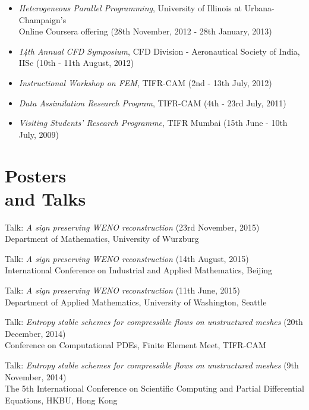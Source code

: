 \documentclass[margin]{res}
\begin{document}
\begin{resume}
\begin{itemize}
               \item{\it Heterogeneous Parallel Programming}, University of Illinois at Urbana-Champaign's \\ Online Coursera offering (28th November, 2012 - 28th January, 2013)
               
               \item{\it 14th Annual CFD Symposium}, CFD Division - Aeronautical Society of India, IISc (10th - 11th August, 2012)

               \item{\it Instructional Workshop on FEM}, TIFR-CAM (2nd - 13th July, 2012)
               
               \item{\it Data Assimilation Research Program}, TIFR-CAM (4th - 23rd July, 2011)

               \item{\it Visiting Students’ Research Programme}, TIFR Mumbai (15th June - 10th July, 2009)
               \end{itemize}          
              
\section{Posters \\ and Talks}
              
              Talk: {\it A sign preserving WENO reconstruction} (23rd November, 2015)\\
               Department of Mathematics, University of W$\ddot{\text{u}}$rzburg 
              
              Talk: {\it A sign preserving WENO reconstruction} (14th August, 2015)\\
              International Conference on Industrial and Applied Mathematics, Beijing
              
              Talk: {\it A sign preserving WENO reconstruction} (11th June, 2015)\\
              Department of Applied Mathematics, University of Washington, Seattle
              
              Talk: {\it Entropy stable schemes for compressible flows on unstructured meshes} (20th December, 2014)\\
               Conference on Computational PDEs, Finite Element Meet, TIFR-CAM  
              
              Talk: {\it Entropy stable schemes for compressible flows on unstructured meshes} (9th November, 2014)\\
               The 5th International Conference on Scientific Computing and Partial Differential Equations, HKBU, Hong Kong              
             

\end{resume}
\end{document}
